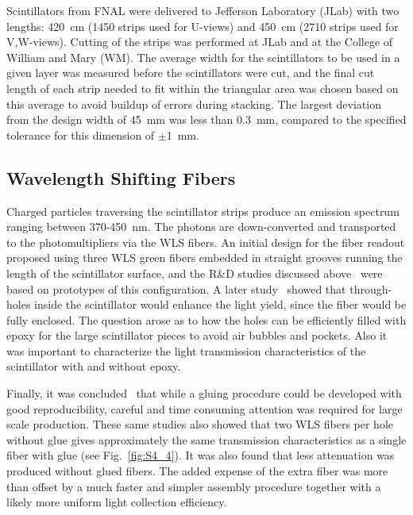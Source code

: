Scintillators from FNAL were delivered to Jefferson Laboratory (JLab) with two lengths: 420~cm (1450 strips
used for U-views) and 450~cm (2710 strips used for V,W-views). Cutting of the strips was performed at JLab
and at the College of William and Mary (WM). The average width for the scintillators to be used in a given layer
was measured before the scintillators were cut, and the final cut length of each strip needed to fit within the
triangular area was chosen based on this average to avoid buildup of errors during stacking. The largest deviation
from the design width of 45~mm was less than 0.3~mm, compared to the specified tolerance for this dimension
of $\pm$1~mm.

\subsection{Wavelength Shifting Fibers}

Charged particles traversing the scintillator strips produce an emission spectrum ranging between 370-450~nm.
The photons are down-converted and transported to the photomultipliers via the WLS fibers. An initial design
for the fiber readout proposed using three WLS green fibers embedded in straight grooves running the length
of the scintillator surface, and the R$\&$D studies discussed above~\cite{2007007} were based on prototypes of
this configuration. A later study~\cite{2009018} showed that through-holes inside the scintillator would enhance
the light yield, since the fiber would be fully enclosed. The question arose as to how the holes can be efficiently
filled with epoxy for the large scintillator pieces to avoid air bubbles and pockets. Also it was important to
characterize the light transmission characteristics of the scintillator with and without epoxy.

Finally, it was concluded~\cite{2010012} that while a gluing procedure could be developed with good
reproducibility, careful and time consuming attention was required for large scale production. These same studies
also showed that two WLS fibers per hole without glue gives approximately the same transmission characteristics
as a single fiber with glue (see Fig.~\ref{fig:S4_4}). It was also found that less attenuation was produced without
glued fibers. The added expense of the extra fiber was more than offset by a much faster and simpler assembly
procedure together with a likely more uniform light collection efficiency. 

